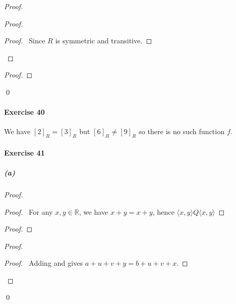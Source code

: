 \documentclass{report}
\begin{document}
    \begin{proof}
        \pf
        \begin{proof}
            \begin{proof}
                \pf\ Since $R$ is symmetric and transitive.
            \end{proof}
        \end{proof}
        \begin{proof}
        \end{proof}
        \qed
    \end{proof}

    \paragraph{Exercise 40}
    We have $[2]_R = [3]_R$ but $[6]_R \neq [9]_R$ so there is no such function $f$.

    \paragraph{Exercise 41}
    \subparagraph{(a)}
    \begin{proof}
        \pf
        \begin{proof}
            \pf\ For any $x, y \in \mathbb{R}$, we have $x + y = x + y$,
            hence $\langle x,y \rangle Q \langle x,y \rangle$
        \end{proof}
        \begin{proof}
        \end{proof}
        \begin{proof}
            \begin{proof}
                \pf\ Adding  and  gives $a + u + v + y = b + u + v + x$.
            \end{proof}
        \end{proof}
        \qed
    \end{proof}
\end{document}
